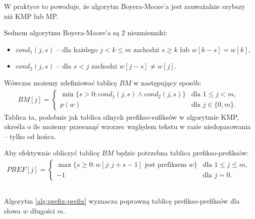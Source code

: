 W praktyce to powoduje, że algorytm Boyera-Moore'a jest zauważalnie szybszy niż KMP lub MP.

Sednem algorytmu Boyera-Moore'a są 2 niezmienniki:
\begin{itemize}
  \item $cond_1(j, s)$ -- dla każdego $j  < k \le m$ zachodzi $s \ge k$ lub $w[k - s] = w[k]$,
  \item $cond_2(j, s)$ -- dla $s < j$ zachodzi $w[j - s] \neq w[j]$.
\end{itemize}

Wówczas możemy zdefiniować tablicę $BM$ w następujący sposób:
\begin{align*}
  BM[j] =
  \begin{cases}
    \min \{s > 0: cond_1(j, s) \land cond_2(j, s)\} & \text{dla $1 \le j < m$}, \\
    p(w) & \text{dla $j \in \{0, m\}$}.
  \end{cases}
\end{align*}
Tablica ta, podobnie jak tablica silnych prefikso-sufiksów w algorytmie KMP, określa o ile możemy przesunąć wzorzec względem tekstu w razie niedopasowania -- tylko od końca.

Aby efektywnie obliczyć tablicę $BM$ będzie potrzebna tablica prefikso-prefiksów:
\begin{align*}
  PREF[j] =
  \begin{cases}
    \max \{s \ge 0: \text{$w[j:j + s - 1]$ jest prefiksem $w$}\} & \text{dla $1 \le j \le m$}, \\
    -1 & \text{dla $j = 0$}.
  \end{cases}
\end{align*}

\begin{code}
\inputminted{python}{code/other/prefix-prefix.py}
\label{alg:prefix-prefix}
\end{code}

\begin{theorem}{}{}
  Algorytm \ref{alg:prefix-prefix} wyznacza poprawną tablicę prefikso-prefiksów dla słowa $w$ długości $m$.
\end{theorem}

